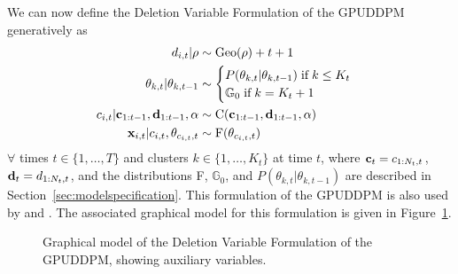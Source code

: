 \documentclass[twocolumn, final]{svjour3}
\begin{document}
We can now define the Deletion Variable Formulation of the GPUDDPM generatively as
\begin{align}
\begin{split}
d_{i,t} | \rho  &\sim \text{Geo}(\rho) + t + 1 \\
\theta_{k, t} | \theta_{k, t-1}  &\sim
\begin{cases}
P(\theta_{k,t} | \theta_{k,t-1}) \hspace{1mm} \text{if} \hspace{1mm} k \leq K_{t} \\ %
\mathbb{G}_{0} \hspace{1mm} \text{if} \hspace{1mm} k = K_{t} + 1
\end{cases} \\
c_{i,t} | \bold{c}_{1:t-1}, \bold{d}_{1:t-1}, \alpha  &\sim  \text{C}(\bold{c}_{1:t-1}, \bold{d}_{1:t-1}, \alpha) \\
\bold{x}_{i,t} | c_{i,t}, \theta_{c_{i,t},t}  &\sim  \text{F}(\theta_{c_{i,t}, t})
\end{split}
\end{align}
$\forall$ times $t \in \{1, \ldots, T\}$ and clusters $k \in \{ 1, \ldots, K_{t} \} $ at time $t$,
where $\bold{c}_{t} = c_{1:N_{t},t}$, $\bold{d}_{t} = d_{1:N_{t},t}$, and the distributions F, $\mathbb{G}_{0}$, and $P(\theta_{k, t} | \theta_{k, t-1})$ are described in Section~\ref{sec:modelspecification}. This formulation of the GPUDDPM is also used by \cite{gasthaus_thesis} and \cite{caron_2007}. The associated graphical model for this formulation is given in Figure~\ref{fig:gpuddpm_gm_2}.
\begin{figure}[h]
        \caption{Graphical model of the Deletion Variable Formulation of the GPUDDPM, showing auxiliary variables.}
        \label{fig:gpuddpm_gm_2}
\end{figure}
\end{document}
